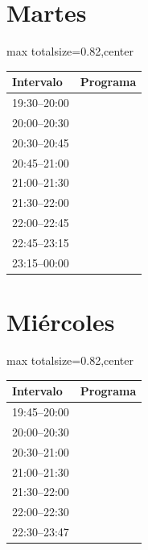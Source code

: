 \documentclass[11pt,a4paper]{article}
\begin{document}
\clearpage
\section*{Martes}
\begin{center}
\begin{adjustbox}{max totalsize={\textwidth}{0.82\textheight},center}
\begin{tabular}{|p{3.6cm}|p{11cm}|}
\hline
\textbf{Intervalo} & \textbf{Programa} \\
\hline
{\centering\rule{0pt}{5.60ex}19:30--20:00} & {\centering\rule{0pt}{5.60ex}} \\
{\centering\rule{0pt}{5.60ex}20:00--20:30} & {\centering\rule{0pt}{5.60ex}} \\
{\centering\rule{0pt}{2.80ex}20:30--20:45} & {\centering\rule{0pt}{2.80ex}} \\
{\centering\rule{0pt}{2.80ex}20:45--21:00} & {\centering\rule{0pt}{2.80ex}} \\
{\centering\rule{0pt}{5.60ex}21:00--21:30} & {\centering\rule{0pt}{5.60ex}} \\
{\centering\rule{0pt}{5.60ex}21:30--22:00} & {\centering\rule{0pt}{5.60ex}} \\
{\centering\rule{0pt}{8.40ex}22:00--22:45} & {\centering\rule{0pt}{8.40ex}} \\
{\centering\rule{0pt}{5.60ex}22:45--23:15} & {\centering\rule{0pt}{5.60ex}} \\
{\centering\rule{0pt}{8.40ex}23:15--00:00} & {\centering\rule{0pt}{8.40ex}} \\
\hline
\end{tabular}
\end{adjustbox}
\end{center}

\clearpage
\section*{Miércoles}
\begin{center}
\begin{adjustbox}{max totalsize={\textwidth}{0.82\textheight},center}
\begin{tabular}{|p{3.6cm}|p{11cm}|}
\hline
\textbf{Intervalo} & \textbf{Programa} \\
\hline
{\centering\rule{0pt}{2.80ex}19:45--20:00} & {\centering\rule{0pt}{2.80ex}} \\
{\centering\rule{0pt}{5.60ex}20:00--20:30} & {\centering\rule{0pt}{5.60ex}} \\
{\centering\rule{0pt}{5.60ex}20:30--21:00} & {\centering\rule{0pt}{5.60ex}} \\
{\centering\rule{0pt}{5.60ex}21:00--21:30} & {\centering\rule{0pt}{5.60ex}} \\
{\centering\rule{0pt}{5.60ex}21:30--22:00} & {\centering\rule{0pt}{5.60ex}} \\
{\centering\rule{0pt}{5.60ex}22:00--22:30} & {\centering\rule{0pt}{5.60ex}} \\
{\centering\rule{0pt}{14.37ex}22:30--23:47} & {\centering\rule{0pt}{14.37ex}} \\
\hline
\end{tabular}
\end{adjustbox}
\end{center}
\end{document}
